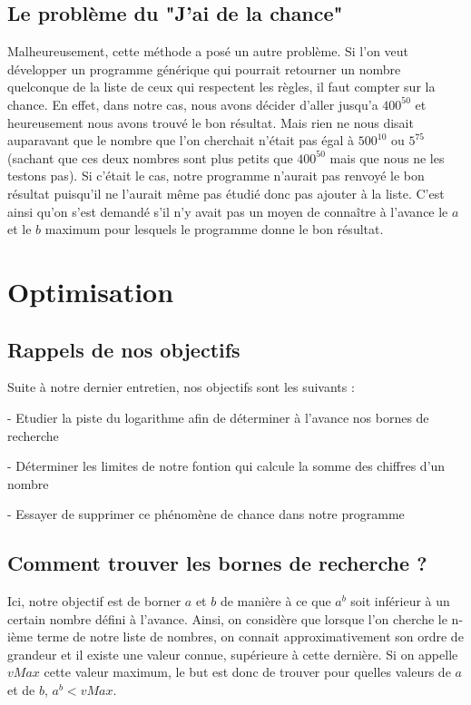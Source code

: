 \documentclass{article}
\begin{document}
\subsection{Le problème du "J'ai de la chance"}
Malheureusement, cette méthode a posé un autre problème. Si l'on veut développer un programme générique qui pourrait retourner un nombre quelconque de la liste de ceux qui respectent les règles, il faut compter sur la chance. En effet, dans notre cas, nous avons décider d'aller jusqu'a $400^{50}$ et heureusement nous avons trouvé le bon résultat. Mais rien ne nous disait auparavant que le nombre que l'on cherchait n'était pas égal à $500^{10}$ ou $5^{75}$ (sachant que ces deux nombres sont plus petits que $400^{50}$ mais que nous ne les testons pas). Si c'était le cas, notre programme n'aurait pas renvoyé le bon résultat puisqu'il ne l'aurait même pas étudié donc pas ajouter à la liste. C'est ainsi qu'on s'est demandé s'il n'y avait pas un moyen de connaître à l'avance le $a$ et le $b$ maximum pour lesquels le programme donne le bon résultat.

\section {Optimisation}
\subsection {Rappels de nos objectifs}
Suite à notre dernier entretien, nos objectifs sont les suivants :

- Etudier la piste du logarithme afin de déterminer à l'avance nos bornes de recherche

- Déterminer les limites de notre fontion qui calcule la somme des chiffres d'un nombre

- Essayer de supprimer ce phénomène de chance dans notre programme

\subsection{Comment trouver les bornes de recherche ?}

Ici, notre objectif est de borner $a$ et $b$ de manière à ce que $a^{b}$ soit inférieur à un certain nombre défini à l'avance. Ainsi, on considère que lorsque l'on cherche le n-ième terme de notre liste de nombres, on connait approximativement son ordre de grandeur et il existe une valeur connue, supérieure à cette dernière. Si on appelle $vMax$ cette valeur maximum, le but est donc de trouver pour quelles valeurs de $a$ et de $b$, $a^{b}  < vMax$.
\end{document}
